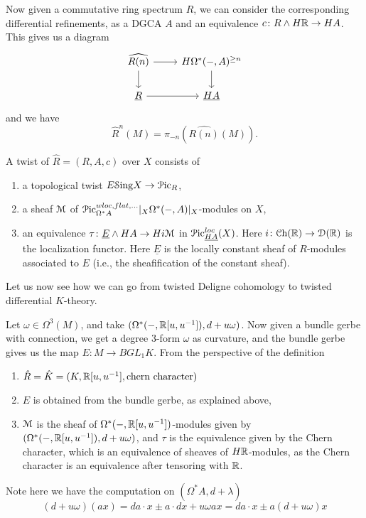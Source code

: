 \documentclass[10pt]{amsart}
\begin{document}
Now given a commutative ring spectrum $R$, we can consider the corresponding differential refinements, as a DGCA $A$ and an equivalence $c\colon R \wedge H\mathbb{R} \to HA$. This gives us a diagram 
\[ 
\begin{tikzcd}
 \widehat{R(n)} \arrow[r] \arrow[d] & H\Omega^*(-,A)^{\geq n} \arrow[d] \\ 
 \underline{R} \arrow[r] & \underline{HA} 
\end{tikzcd}
\]
and we have 
\[
\hat{R}^n(M) = \pi_{-n}(\widehat{R(n)}(M)).
\]

A twist of $\hat{R} = (R,A,c)$ over $X$ consists of
\begin{enumerate}
  \item a topological twist $E\mathcal{S}\mathrm{ing} X \to  \mathcal{P}\mathrm{ic}_R$,
  \item a sheaf $\mathcal{M}$ of $\mathcal{P}\mathrm{ic}^{wloc,flat, ...}_{\Omega^*A}|_X \Omega^*(-,A)|_X$-modules on $X$,
  \item an equivalence $\tau\colon\underline{E} \wedge H A \to Hi\mathcal{M}$ in $\mathcal{P}\mathrm{ic}^{loc}_{\underline{HA}}(X)$. Here $i\colon \mathcal{C}\mathrm{h}(\mathbb{R}) \to \mathcal{D}(\mathbb{R})$ is the localization functor. Here $\underline{E}$ is the locally constant sheaf of $R$-modules associated to $E$ (i.e., the sheafification of the constant sheaf).
\end{enumerate}

Let us now see how we can go from twisted Deligne cohomology to twisted differential $K$-theory. 
\begin{example}
  Let $\omega \in \Omega^3(M)$, and take $(\Omega^*(-,\mathbb{R}[u,u^{-1}]), d + u\omega)$. Now given a bundle gerbe with connection, we get a degree $3$-form $\omega$ as curvature, and the bundle gerbe gives us the map $E\colon M \to BGL_1K$. From the perspective of the definition 
  \begin{enumerate}
    \item $\hat{R} = \hat{K} = (K,\mathbb{R}[u,u^{-1}], \text{chern character})$
    \item $E$ is obtained from the bundle gerbe, as explained above,
    \item $\mathcal{M}$ is the sheaf of $\Omega^*(-,\mathbb{R}[u,u^{-1}])$-modules given by $(\Omega^*(-,\mathbb{R}[u,u^{-1}]), d + u\omega)$, and $\tau$ is the equivalence given by the Chern character, which is an equivalence of sheaves of $H\mathbb{R}$-modules, as the Chern character is an equivalence after tensoring with $\mathbb{R}$.
  \end{enumerate}
 Note here we have the computation on $(\Omega^*A, d + \lambda)$
 \[(d + u \omega)(a x) = da \cdot x \pm a \cdot dx + u\omega a x = d a \cdot x \pm a (d + u\omega) x \]
\end{example}


{\footnotesize
 
 
 }
\end{document}
